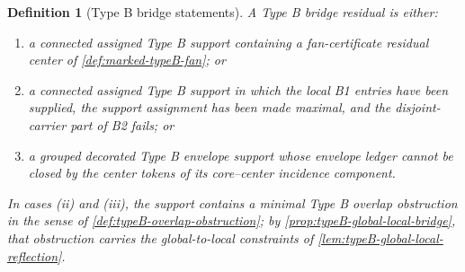 \documentclass[11pt]{article}
\newtheorem{definition}[theorem]{Definition}
\begin{document}
\begin{definition}[Type B bridge statements]
A \emph{Type B bridge residual} is either:
\begin{enumerate}[label=(\roman*), leftmargin=2.2em]
\item a connected assigned Type B support containing a fan-certificate residual
center of \cref{def:marked-typeB-fan}; or
\item a connected assigned Type B support in which the local B1 entries have
been supplied, the support assignment has been made maximal, and the
disjoint-carrier part of B2 fails; or
\item a grouped decorated Type B envelope support whose envelope ledger cannot
be closed by the center tokens of its core--center incidence component.
\end{enumerate}
In cases (ii) and (iii), the support contains a minimal Type B overlap
obstruction in the sense of \cref{def:typeB-overlap-obstruction}; by
\cref{prop:typeB-global-local-bridge}, that obstruction carries the
global-to-local constraints of \cref{lem:typeB-global-local-reflection}.
\end{definition}
\end{document}
